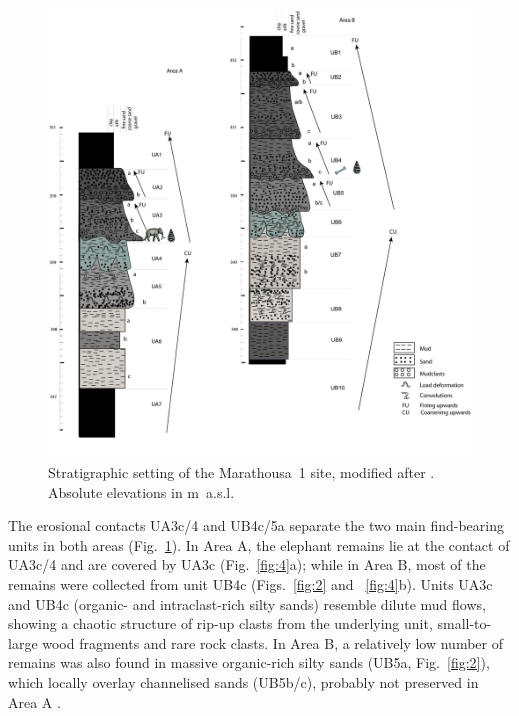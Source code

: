 \documentclass[preprint,authoryear,times]{elsarticle} %
\begin{document}
\begin{figure}[]
  \centering
  \includegraphics[width=1\textwidth]{./artwork/Fig3.pdf}
  \caption{Stratigraphic setting of the Marathousa~1 site, modified after \cite{Karkanas}. Absolute elevations in m~a.s.l.}
  \label{fig:3}
\end{figure}

The erosional contacts UA3c/4 and UB4c/5a separate the two main find-bearing units in both areas (Fig.~\ref{fig:3}). In Area A, the elephant remains lie at the contact of UA3c/4 and are covered by UA3c (Fig.~\ref{fig:4}a); while in Area B, most of the remains were collected from unit UB4c (Figs.~\ref{fig:2} and ~\ref{fig:4}b). Units UA3c and UB4c (organic- and intraclast-rich silty sands) resemble dilute mud flows, showing a chaotic structure of rip-up clasts from the underlying unit, small-to-large wood fragments and rare rock clasts. In Area B, a relatively low number of remains was also found in massive organic-rich silty sands (UB5a, Fig.~\ref{fig:2}), which locally overlay channelised sands (UB5b/c), probably not preserved in Area A \citep{Karkanas}.
\end{document}
